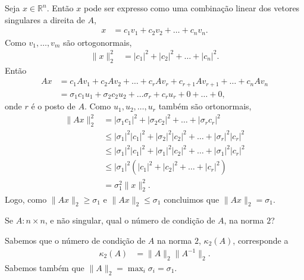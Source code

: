 \documentclass[a4paper,12pt, leqno, answers]{exam}
\begin{document}
\begin{questions}
\begin{solution}
        Seja $x \in \mathbb{R}^n$. Ent\~{a}o $x$ pode ser expresso como uma combina\c{c}\~{a}o linear dos vetores singulares a direita de $A$,
        \begin{align*}
            x &= c_1 v_1 + c_2 v_2 + \ldots + c_n v_n.
        \end{align*}
        Como $v_1, \ldots, v_m$ s\~{a}o ortogonormais,
        \begin{align*}
            \| x \|_2^2 &= | c_1 |^2 + | c_2 |^2 + \ldots + | c_n |^2.
        \end{align*}
        Ent\~{a}o
        \begin{align*}
            A x &= c_1 A v_1 + c_2 A v_2 + \ldots + c_r A v_r + c_{r + 1} A v_{r + 1} + \ldots + c_n A v_n \\
            &= \sigma_1 c_1 u_1 + \sigma_2 c_2 u_2 + \ldots \sigma_r + c_r u_r + 0 + \ldots + 0,
        \end{align*}
        onde $r$ \'{e} o posto de $A$. Como $u_1, u_2, \ldots, u_r$ tamb\'{e}m s\~{a}o ortonormais,
        \begin{align*}
            \| A x \|_2^2 &= | \sigma_1 c_1 |^2 + | \sigma_2 c_2 |^2 + \ldots + | \sigma_r c_r |^2 \\
            &\leq | \sigma_1 |^2 | c_1 |^2 + | \sigma_2 |^2 | c_2 |^2 + \ldots + | \sigma_r |^2 | c_r |^2 \\
            &\leq | \sigma_1 |^2 | c_1 |^2 + | \sigma_1 |^2 | c_2 |^2 + \ldots + | \sigma_1 |^2 | c_r |^2 \\
            &\leq | \sigma_1 |^2 \left( | c_1 |^2 + | c_2 |^2 + \ldots + | c_r |^2 \right) \\
            &= \sigma_1^2 \| x \|_2^2.
        \end{align*}
        Logo, como $\| A x \|_2 \geq \sigma_1$ e $\| A x \|_2 \leq \sigma_1$ concluimos que $\| A x \|_2 = \sigma_1$.
    \end{solution}

     Se $A : n \times n$, e n\~{a}o singular, qual o n\'{u}mero de condi\c{c}\~{a}o de $A$, na norma $2$?
    \begin{solution}
        Sabemos que o n\'{u}mero de condi\c{c}\~{a}o de $A$ na norma $2$, $\kappa_2(A)$, corresponde a
        \begin{align*}
            \kappa_2(A) &= \| A \|_2 \| A^{-1} \|_2.
        \end{align*}
        Sabemos tamb\'{e}m que $\| A \|_2 = \max_i \sigma_i = \sigma_1$.


\end{solution}
\end{questions}
\end{document}
